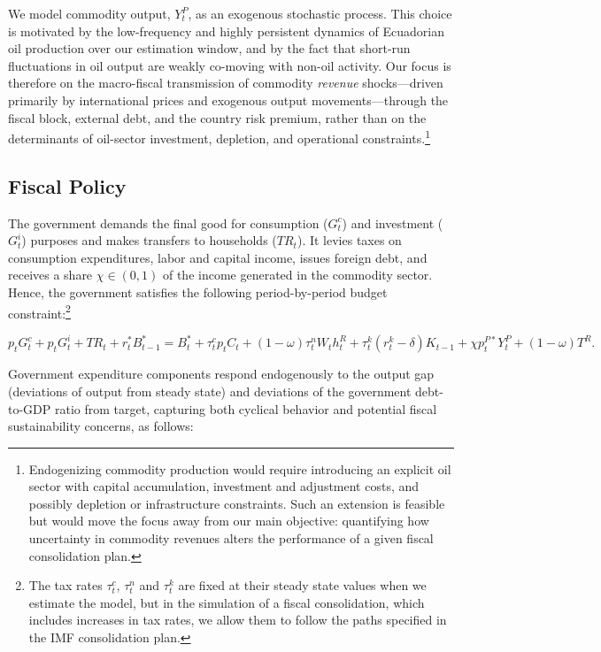 \documentclass[12pt]{article}
\begin{document}
We model commodity output, $Y_t^P$, as an exogenous stochastic process. This choice is motivated by the low-frequency and highly persistent dynamics of Ecuadorian oil production over our estimation window, and by the fact that short-run fluctuations in oil output are weakly co-moving with non-oil activity. Our focus is therefore on the macro-fiscal transmission of commodity \emph{revenue} shocks---driven primarily by international prices and exogenous output movements---through the fiscal block, external debt, and the country risk premium, rather than on the determinants of oil-sector investment, depletion, and operational constraints.\footnote{Endogenizing commodity production would require introducing an explicit oil sector with capital accumulation, investment and adjustment costs, and possibly depletion or infrastructure constraints. Such an extension is feasible but would move the focus away from our main objective: quantifying how uncertainty in commodity revenues alters the performance of a given fiscal consolidation plan.}

\subsection{Fiscal Policy}

The government demands the final good for consumption ($G^c_{t}$) and investment ($G^i_{t}$) purposes and makes transfers to households ($TR_t$). It levies taxes on consumption expenditures, labor and capital income, issues foreign debt, and receives a share $\chi\in(0,1)$ of the income generated in the commodity sector. Hence, the government satisfies the following period-by-period budget constraint:\footnote{The tax rates $\tau^c_t$, $\tau^n_t$ and $\tau^k_t$ are fixed at their steady state values when we estimate the model, but in the simulation of a fiscal consolidation, which includes increases in tax rates, we allow them to follow the paths specified in the IMF consolidation plan.}

\begin{equation}
p_tG^c_{t} + p_tG^i_{t} + TR_{t}  + r_t^{\ast}B_{t-1}^{\ast} = B_t^* + \tau^c_tp_tC_t + (1-\omega)\tau^n_tW_th_t^R + \tau^k_t(r^k_t-\delta)K_{t-1} + \chi p_{t}^{P*}Y_{t}^{P} + (1-\omega)T^R. %
\label{eq:FiscalPolicy}
\end{equation}%

Government expenditure components respond endogenously to the output gap (deviations of output from steady state) and deviations of the government debt-to-GDP ratio from target, capturing both cyclical behavior and potential fiscal sustainability concerns, as follows:
\end{document}
